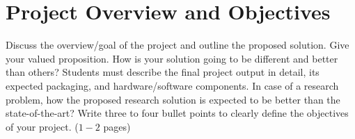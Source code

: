 
\chapter{Project Overview and Objectives}
\label{Chapter4}

Discuss the overview/goal of the project and outline the proposed solution. Give your valued proposition. How is your solution going to be different and better than others? Students must describe the final project output in detail, its expected packaging, and hardware/software components. In case of a research problem, how the proposed research solution is expected to be better than the state-of-the-art? Write three to four bullet points to clearly define the objectives of your project. ($1-2$ pages)